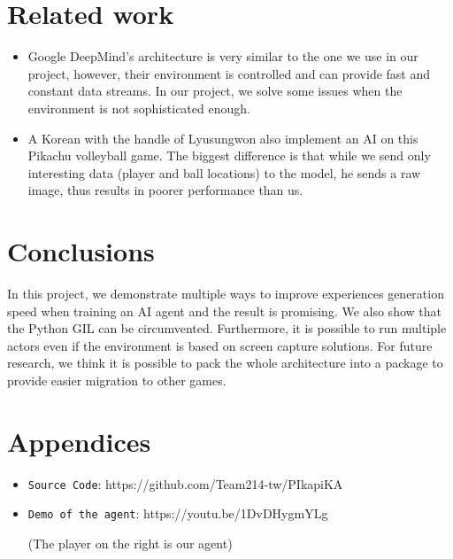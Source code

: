 \documentclass[sigconf]{acmart}
\begin{document}
\section{Related work}
\begin{itemize}
  \item{} Google DeepMind's architecture\cite{horgan2018distributed} is very similar to the one we use in our project, however, their environment is controlled and can provide fast and constant data streams. In our project, we solve some issues when the environment is not sophisticated enough.
 
  \item{} A Korean with the handle of Lyusungwon also implement an AI on this Pikachu volleyball game. \cite{PikaKR} The biggest difference is that while we send only interesting data (player and ball locations) to the model, he sends a raw image, thus results in poorer performance than us. 
\end{itemize}
\section{Conclusions}
In this project, we demonstrate multiple ways to improve experiences generation speed when training an AI agent and the result is promising. We also show that the Python GIL can be circumvented. Furthermore, it is possible to run multiple actors even if the environment is based on screen capture solutions. For future research, we think it is possible to pack the whole architecture into a package to provide easier migration to other games.

\section{Appendices}
\begin{itemize}
  \item{\verb|Source Code|}: https://github.com/Team214-tw/PIkapiKA
  \item{\verb|Demo of the agent|}: 
  https://youtu.be/1DvDHygmYLg 
  \begin{sloppypar}
    (The player on the right is our agent)
  \end{sloppypar}

\end{itemize}



\end{document}
